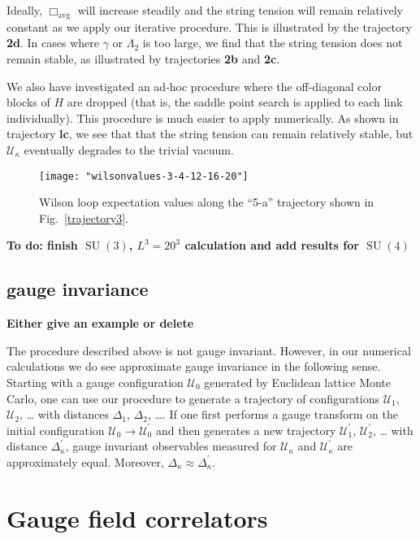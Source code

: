 \documentclass[preprint,aps,prd]{revtex4-2}
\newcommand{\plaquette}{\Box}
\newcommand{\config}{\mathcal{U}}
\DeclareMathOperator{\SU}{SU}
\begin{document}
Ideally, $\plaquette_\mathrm{avg}$ will increase steadily and the string tension will remain relatively constant as we apply our iterative procedure.
This is illustrated by the trajectory {\bf 2d}.
In cases where $\gamma$ or $\Lambda_2$ is too large, we find that the
string tension does not remain stable, as illustrated by
trajectories {\bf 2b} and {\bf 2c}.

We also have investigated an ad-hoc procedure where
the off-diagonal color blocks of $H$ are dropped (that is, the
saddle point search is applied to each link individually).
This procedure is much easier to apply numerically.
As shown in trajectory {\bf lc},
we see that that the string tension can remain relatively stable,
but $\config_\kappa$ eventually degrades to the trivial vacuum.


\begin{figure}
\texttt{[image: "wilsonvalues-3-4-12-16-20"]}
\caption{Wilson loop expectation values along the ``5-a'' trajectory
 shown in Fig.~\ref{trajectory3}.}
\end{figure}

{\bf  To do:
  finish $\SU(3)$, $L^3=20^3$ calculation and
  add results for $\SU(4)$}

\subsection{gauge invariance}

{\bf Either give an example or delete }

The procedure described above is not gauge invariant.
However, in our numerical calculations we do see approximate
gauge invariance in the following
sense.  Starting with a gauge configuration $\config_0$ generated
by Euclidean lattice Monte Carlo, one can
use our procedure to generate a trajectory of configurations
$\config_1$, $\config_2$, \ldots
with distances $\Delta_1$, $\Delta_2$, \ldots.
If one first performs a gauge transform on the initial
configuration $\config_0 \to \config_0^\prime$ and then generates a
new trajectory $\config_1^\prime$, $\config_2^\prime$, \ldots
with distance $\Delta_\kappa^\prime$,
gauge invariant observables
measured for $\config_\kappa$ and $\config_\kappa^\prime$ are approximately equal.
Moreover,  $\Delta_\kappa \approx \Delta_\kappa^\prime$.



\section{Gauge field correlators}
\end{document}
